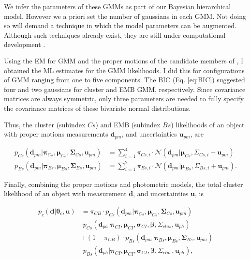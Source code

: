 We infer the parameters of these GMMs as part of our Bayesian hierarchical model. However we a priori set the number of gaussians in each GMM. Not doing so will demand a technique in which the model parameters can be augmented. Although such techniques already exist, they are still under computational development \cite[see][for a review of reversible jump MCMC]{Fan2011}.

Using the EM for GMM and the proper motions of the candidate members of \citet{Bouy2015}, I obtained the ML estimates for the GMM likelihoods. I did this for configurations of GMM ranging from one to five components. The BIC (Eq. \ref{eq:BIC}) suggested four and two gaussians for cluster and EMB GMM, respectively. Since covariance matrices are always symmetric, only three parameters are needed to fully specify the covariance matrices of these bivariate normal distributions.

Thus, the cluster (subindex $Cs$) and EMB (subindex $Bs$) likelihoods of an object with proper motions measurements $\mathbf{d}_{pm}$, and uncertainties $\mathbf{u}_{pm}$, are

\begin{align}
p_{Cs}(\mathbf{d}_{pm}| \boldsymbol{\pi}_{Cs}, \boldsymbol{\mu}_{Cs},\boldsymbol{\Sigma}_{Cs},\mathbf{u}_{pm})
&= \sum_{i=1}^4\pi_{Cs,i}\cdot \mathcal{N}(\mathbf{d}_{pm} | \boldsymbol{\mu}_{Cs},\Sigma_{Cs,i}+\mathbf{u}_{pm}) \nonumber\\
p_{Bs}(\mathbf{d}_{pm}| \boldsymbol{\pi}_{Bs}, \boldsymbol{\mu}_{Bs},\boldsymbol{\Sigma}_{Bs},\mathbf{u}_{pm})
&= \sum_{i=1}^2\pi_{Bs,i}\cdot \mathcal{N}(\mathbf{d}_{pm} | \boldsymbol{\mu}_{Bs},\Sigma_{Bs,i}+\mathbf{u}_{pm}).
\label{eq:lik-pm}
\end{align}

Finally, combining the proper motions and photometric models, the total cluster likelihood of an object with measurement $\mathbf{d}$, and uncertainties $\mathbf{u}$, is

\begin{align}
p_c(\mathbf{d}|\boldsymbol{\theta}_c,\mathbf{u})&=\pi_{CB}\cdot p_{Cs}(\mathbf{d}_{pm}| \boldsymbol{\pi}_{Cs}, \boldsymbol{\mu}_{Cs},\boldsymbol{\Sigma}_{Cs},\mathbf{u}_{pm}) \nonumber \\ &\cdot  p_{Cs}(\mathbf{d}_{ph}|\boldsymbol{\pi}_{CI},\boldsymbol{\mu}_{CI},\boldsymbol{\sigma}_{CI},\boldsymbol{\beta},\Sigma_{clus},\mathbf{u}_{ph})\nonumber\\
&+(1-\pi_{CB})\cdot p_{Bs}(\mathbf{d}_{pm}| \boldsymbol{\pi}_{Bs}, \boldsymbol{\mu}_{Bs},\boldsymbol{\Sigma}_{Bs},\mathbf{u}_{pm}) \nonumber \\
&\cdot  p_{Bs}(\mathbf{d}_{ph}|\boldsymbol{\pi}_{CI},\boldsymbol{\mu}_{CI},\boldsymbol{\sigma}_{CI}, \boldsymbol{\beta},\Sigma_{clus}, \mathbf{u}_{ph}),
\end{align}

